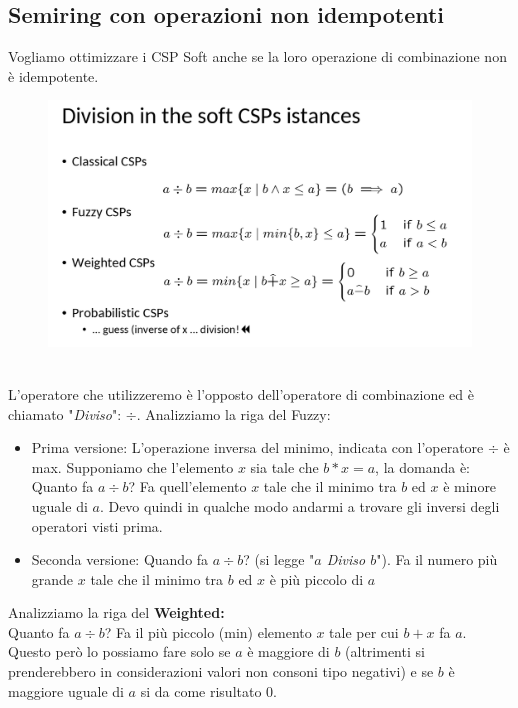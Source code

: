 \subsection{Semiring con operazioni non idempotenti}
Vogliamo ottimizzare i CSP Soft anche se la loro operazione di combinazione non
è idempotente.
\begin{figure}[htp]
    \centering
    \includegraphics[width=13cm, keepaspectratio]{img/Cap5/divisione.png}
\end{figure}
\\L'operatore che utilizzeremo è l'opposto dell'operatore di combinazione ed è
chiamato "\textit{Diviso}": $\div$. Analizziamo la riga del Fuzzy:
\begin{itemize}
    \item Prima versione: L'operazione inversa del minimo, indicata con
          l'operatore $\div$ è max. Supponiamo che l'elemento $x$ sia tale che
          $b * x = a$, la domanda è: Quanto fa $a \div b$? Fa quell'elemento $x$
          tale che il minimo tra $b$ ed $x$ è minore uguale di $a$. Devo quindi in
          qualche modo andarmi a trovare gli inversi degli operatori visti
          prima.
    \item  Seconda versione: Quando fa $a \div b$? (si legge "\textit{$a$ Diviso $b$}"). Fa il
          numero più grande $x$ tale che il minimo tra $b$ ed $x$ è più piccolo di $a$
\end{itemize}
Analizziamo la riga del \textbf{Weighted:}\\
Quanto fa $a \div b$? Fa il più
piccolo (min) elemento $x$ tale per cui $b + x$ fa $a$. Questo però lo possiamo fare
solo se $a$ è maggiore di $b$ (altrimenti si prenderebbero in considerazioni valori
non consoni tipo negativi) e se $b$ è maggiore uguale di $a$ si da come risultato 0.\\
\newpage

